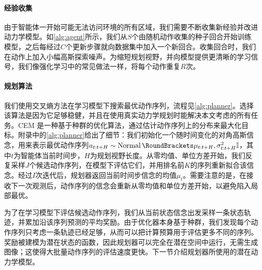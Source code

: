 \paragraph{经验收集}

由于智能体一开始可能无法访问环境的所有区域，我们需要不断收集新经验并改进动力学模型。如\cref{alg:agent}所示，我们从$S$个由随机动作收集的种子回合开始训练模型，之后每经过$C$个更新步骤就向数据集中加入一个新回合。收集回合时，我们在动作上加入小幅高斯探索噪声。为缩短规划视野，并向模型提供更清晰的学习信号，我们像强化学习中的常见做法一样，将每个动作重复$R$次\citep{mnih2015dqn,mnih2016a3c}。

\paragraph{规划算法}

我们使用交叉熵方法\citep[CEM;][]{rubinstein1997cem,chua2018pets}在学习模型下搜索最优动作序列，流程见\cref{alg:planner}。选择该算法是因为它足够稳健，并且在使用真实动力学规划时能解决本文考虑的所有任务。CEM 是一种基于种群的优化算法，通过估计动作序列上的分布来最大化目标。附录中的\cref{alg:planner}给出了细节：我们初始化一个随时间变化的对角高斯信念，用来表示最优动作序列$a_{t:t+H}\sim\Normal(\mu_{t:t+H},\sigma^2_{t:t+H}\mathbb{I})$，其中$t$为智能体当前时间步，$H$为规划视野长度。从零均值、单位方差开始，我们反复采样$J$个候选动作序列，在模型下评估它们，并用排名前$K$的序列重新拟合该信念。经过$I$次迭代后，规划器返回当前时间步信念的均值$\mu_t$。需要注意的是，在接收下一次观测后，动作序列的信念会重新从零均值和单位方差开始，以避免陷入局部最优。

为了在学习模型下评估候选动作序列，我们从当前状态信念出发采样一条状态轨迹，并累加沿该序列预测的平均奖励。由于优化器本身基于种群，我们发现每个动作序列只考虑一条轨迹已经足够，从而可以把计算预算用于评估更多不同的序列。奖励被建模为潜在状态的函数，因此规划器可以完全在潜在空间中运行，无需生成图像；这使得大批量动作序列的评估速度更快。下一节介绍规划器所使用的潜在动力学模型。
